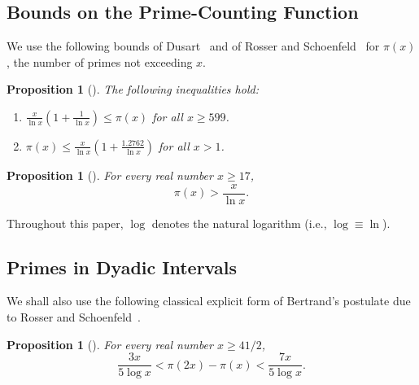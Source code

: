 \documentclass[11pt]{amsart}
\newtheorem{Proposition}[Theorem]{Proposition}
\theoremstyle{definition}
\theoremstyle{remark}
\begin{document}
\subsection{Bounds on the Prime-Counting Function}
We use the following bounds of Dusart~\cite{dusart1998autour} and of Rosser and Schoenfeld~\cite{rosser1962approximate} for $\pi(x)$, the number of primes not exceeding $x$.
\begin{Proposition}[{\cite[Th\'eor\`eme~1.10, p.\,36]{dusart1998autour}}]
\label{prop:dusart-upper}
The following inequalities hold:
\begin{enumerate}
\item[\emph{(1)}] $\displaystyle \frac{x}{\ln x}\left(1 + \frac{1}{\ln x}\right) \leq \pi(x)$ \quad for all $x \geq 599$.
\item[\emph{(2)}] $\displaystyle \pi(x) \leq \frac{x}{\ln x}\left(1 + \frac{1.2762}{\ln x}\right)$ \quad for all $x > 1$.
\end{enumerate}
\end{Proposition}
\begin{Proposition}[{\cite[Corollary~1, (3.5)]{rosser1962approximate}}]
\label{prop:rs-pi}
For every real number $x\geq 17$,
\[
\pi(x)>\frac{x}{\ln x}.
\]
\end{Proposition}
Throughout this paper, $\log$ denotes the natural logarithm (i.e., $\log \equiv \ln$).

\subsection{Primes in Dyadic Intervals}
We shall also use the following classical explicit form of Bertrand's postulate due to Rosser and Schoenfeld~\cite{rosser1962approximate}.
\begin{Proposition}[{\cite[Corollaries~3.8--3.9]{rosser1962approximate}}]\label{prop:rs-dyadic}
For every real number $x\geq 41/2$,
\[
\frac{3x}{5\log x}<\pi(2x)-\pi(x)<\frac{7x}{5\log x}.
\]
\end{Proposition}
\end{document}
